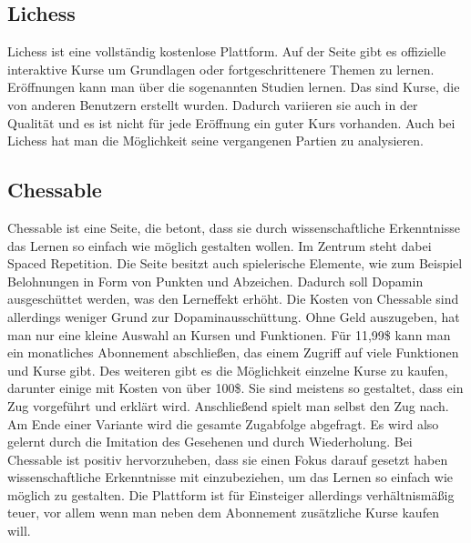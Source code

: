 \subsection{Lichess}
Lichess ist eine vollständig kostenlose Plattform. Auf der Seite gibt es offizielle interaktive Kurse um Grundlagen oder fortgeschrittenere Themen zu lernen. Eröffnungen kann man über die sogenannten Studien lernen. Das sind Kurse, die von anderen Benutzern erstellt wurden. Dadurch variieren sie auch in der Qualität und es ist nicht für jede Eröffnung ein guter Kurs vorhanden. Auch bei Lichess hat man die Möglichkeit seine vergangenen Partien zu analysieren.

\subsection{Chessable}
Chessable ist eine Seite, die betont, dass sie durch wissenschaftliche Erkenntnisse das Lernen so einfach wie möglich gestalten wollen. \cite{prof_barry_hymer_science_nodate} Im Zentrum steht dabei Spaced Repetition. Die Seite besitzt auch spielerische Elemente, wie zum Beispiel Belohnungen in Form von Punkten und Abzeichen.
Dadurch soll Dopamin ausgeschüttet werden, was den Lerneffekt erhöht.
Die Kosten von Chessable sind allerdings weniger Grund zur Dopaminausschüttung.
Ohne Geld auszugeben, hat man nur eine kleine Auswahl an Kursen und Funktionen.
Für 11,99\$ kann man ein monatliches Abonnement abschließen, das einem Zugriff auf viele Funktionen und Kurse gibt. Des weiteren gibt es die Möglichkeit einzelne Kurse zu kaufen, darunter einige mit Kosten von über 100\$.
Sie sind meistens so gestaltet, dass ein Zug vorgeführt und erklärt wird. Anschließend spielt man selbst den Zug nach. Am Ende einer Variante wird die gesamte Zugabfolge abgefragt. Es wird also gelernt durch die Imitation des Gesehenen und durch Wiederholung.
Bei Chessable ist positiv hervorzuheben, dass sie einen Fokus darauf gesetzt haben wissenschaftliche Erkenntnisse mit einzubeziehen, um das Lernen so einfach wie möglich zu gestalten. Die Plattform ist für Einsteiger allerdings verhältnismäßig teuer, vor allem wenn man neben dem Abonnement zusätzliche Kurse kaufen will.

